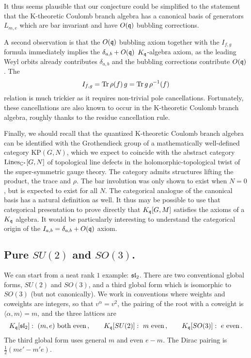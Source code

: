 \documentclass[12pt]{amsart}
\begin{document}
It thus seems plausible that our conjecture could be simplified to the statement that the K-theoretic Coulomb branch algebra has a canonical basis of generators $L_{m,e}$ which are bar invariant and have $O(\mathfrak{q})$ bubbling corrections. 

A second observation is that the $O(\mathfrak{q})$ bubbling axiom together with the $I_{f,g}$ formula immediately implies the $\delta_{a,b} + O(\mathfrak{q})$ 
$K_{\mathfrak{q}}$-algebra axiom, as the leading Weyl orbits already contributes $\delta_{a,b}$ and the bubbling corrections contribute $O(\mathfrak{q})$. The 
\begin{equation}
 I_{f,g} = \operatorname{Tr} \rho(f) \,g = \operatorname{Tr} g \,\rho^{-1}(f) 
\end{equation}
relation is much trickier as it requires non-trivial pole cancellations. Fortunately, these cancellations are also known to occur in the K-theoretic Coulomb branch algebra, roughly thanks to the residue cancellation rule. 

Finally, we should recall that the quantized K-theoretic Coulomb branch algebra can be identified with the Grothendieck group of a mathematically well-defined category $\mathrm{KP}(G,N)$, which we expect to coincide with the abstract category $\mathrm{Lines}_{\mathbb{C}^*}[G,N]$ of topological line defects in the holomorphic-topological twist of the super-symmetric gauge theory. The category admits structures lifting the product, the trace and $\rho$. The bar involution was only shown to exist when $N=0$, but is expected to exist for all $N$. The categorical analogue of the canonical basis has a natural definition as well. It thus may be possible to use that categorical presentation to prove directly that $K_{\mathfrak{q}}[G,M]$ satisfies the axioms of a $K_{\mathfrak{q}}$ algebra. It would be particularly interesting to understand the categorical origin of the $I_{a,b} = \delta_{a,b} + O(\mathfrak{q})$ axiom.

\subsection{Pure $SU(2)$ and $SO(3)$.}
We can start from a neat rank $1$ example: $\mathfrak{sl}_2$. There are two conventional global forms, $SU(2)$ and $SO(3)$, 
and a third global form which is isomorphic to $SO(3)$ (but not canonically). We work in conventions where weights and coweights are
integers, so that $v^{\alpha}=v^{2}$, the pairing of the root with a coweight is
$\langle\alpha,m\rangle = m$, and the three lattices are
\begin{equation}\label{eq:su2so3lat}
	K_{\mathfrak{q}}[\mathfrak{sl}_2]:\ (m,e) \ \text{both even} \,,\qquad
	K_{\mathfrak{q}}[SU(2)]:\ m \ \text{even} \,,\qquad
	K_{\mathfrak{q}}[SO(3)]:\ e \ \text{even} \,.
\end{equation}
The third global form uses general $m$ and even $e-m$. The Dirac pairing is
$\tfrac12(me'-m'e)$.
\end{document}
